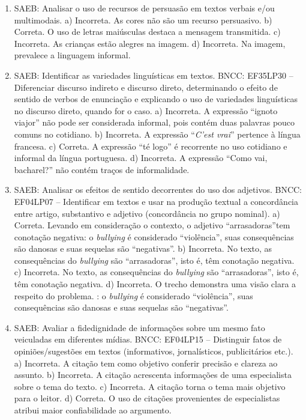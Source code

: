 \begin{enumerate}
\item
SAEB: Analisar o uso de recursos de persuasão em textos verbais e/ou multimodais. a) Incorreta. As cores não são um recurso persuasivo. b) Correta. O uso de letras maiúsculas destaca a mensagem transmitida. c) Incorreta. As crianças estão alegres na imagem. d) Incorreta. Na imagem, prevalece a linguagem informal.

\item
SAEB: Identificar as variedades linguísticas em textos. BNCC: EF35LP30 -- Diferenciar discurso indireto e discurso direto, determinando o efeito de sentido de verbos de enunciação e explicando o uso de variedades linguísticas no discurso direto, quando for o caso. a) Incorreta. A expressão ``ignoto viajor'' não pode ser considerada informal, pois contém duas palavras pouco comuns no cotidiano. b) Incorreta. A expressão ``\textit{C'est vrai}'' pertence à língua francesa. c) Correta. A expressão ``té logo'' é recorrente no uso cotidiano e informal da língua portuguesa. d) Incorreta. A expressão ``Como vai, bacharel?'' não contém traços de informalidade.

\item
SAEB: Analisar os efeitos de sentido decorrentes do uso dos adjetivos. BNCC: EF04LP07 -- Identificar em textos e usar na produção textual a concordância entre artigo, substantivo e adjetivo (concordância no grupo nominal). a) Correta. Levando em consideração o contexto, o adjetivo ``arrasadoras''tem conotação negativa: o \textit{bullying} é considerado ``violência'', suas consequências são danosas e suas sequelas são ``negativas''. b) Incorreta. No texto, as consequências do \textit{bullying} são ``arrasadoras'', isto é, têm conotação negativa. c) Incorreta. No texto, as consequências do \textit{bullying} são ``arrasadoras'', isto é, têm conotação negativa. d) Incorreta. O trecho demonstra uma visão clara a respeito do problema. : o \textit{bullying} é considerado ``violência'', suas consequências são danosas e suas sequelas são ``negativas''.

\item
SAEB: Avaliar a fidedignidade de informações sobre um mesmo fato veiculadas em diferentes mídias. BNCC: EF04LP15 -- Distinguir fatos de opiniões/sugestões em textos (informativos, jornalísticos, publicitários etc.). a) Incorreta. A citação tem como objetivo conferir precisão e clareza ao assunto. b) Incorreta. A citação acrescenta informações de uma especialista sobre o tema do texto. c) Incorreta. A citação torna o tema mais objetivo para o leitor. d) Correta. O uso de citações provenientes de especialistas atribui maior confiabilidade ao argumento.


\end{enumerate}
